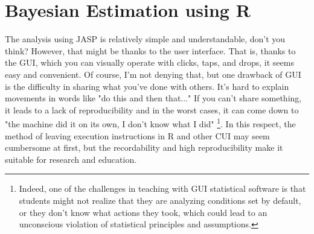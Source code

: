 \documentclass{ltjbook}
\begin{document}
\chapter{Bayesian Estimation using R}
\label{m29_brms}
The analysis using JASP is relatively simple and understandable, don't you think? However, that might be thanks to the user interface. That is, thanks to the GUI, which you can visually operate with clicks, taps, and drops, it seems easy and convenient.
Of course, I'm not denying that, but one drawback of GUI is the difficulty in sharing what you've done with others. It's hard to explain movements in words like "do this and then that..." If you can't share something, it leads to a lack of reproducibility and in the worst cases, it can come down to "the machine did it on its own, I don't know what I did" \footnote{Indeed, one of the challenges in teaching with GUI statistical software is that students might not realize that they are analyzing conditions set by default, or they don't know what actions they took, which could lead to an unconscious violation of statistical principles and assumptions.}. In this respect, the method of leaving execution instructions in R and other CUI may seem cumbersome at first, but the recordability and high reproducibility make it suitable for research and education.
\end{document}

